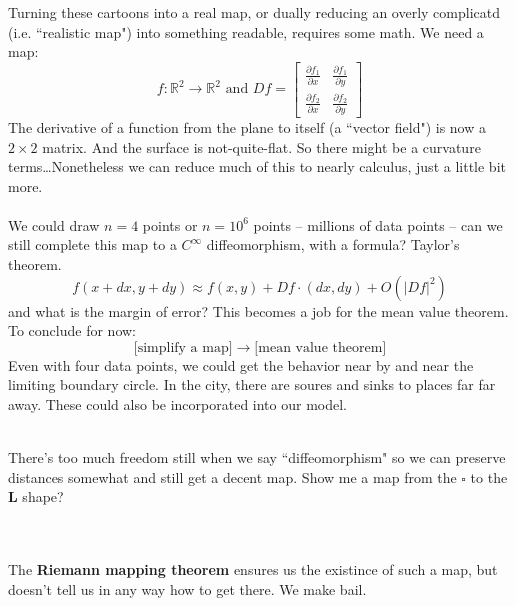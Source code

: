 \documentclass[12pt]{article}
\begin{document}
Turning these cartoons into a real map, or dually reducing an overly complicatd (i.e. ``realistic map") into something readable, requires some math.  We need a map:
$$ f: \mathbb{R}^2 \to \mathbb{R}^2 \text{ and } Df = \left[ \begin{array}{cc}
\frac{\partial f_1}{\partial x} & \frac{\partial f_1}{\partial y}  \\ 
\frac{\partial f_2}{\partial x} & \frac{\partial f_2}{\partial y}  \end{array} \right] $$
The derivative of a function from the plane to itself (a ``vector field") is now a $2 \times 2$ matrix.  And the surface is not-quite-flat.  So there might be a curvature terms\dots Nonetheless we can reduce much of this to nearly calculus, just a little bit more. \\ \\ 
We could draw $n = 4$ points or $n = 10^6$ points -- millions of data points -- can we still complete this map to a $C^\infty$ diffeomorphism, with a formula?  Taylor's theorem.
$$ f(x + dx, y+dy) \approx f(x,y) +  Df \cdot (dx,dy)  + O(|Df|^2)$$
and what is the margin of error?  This becomes a job for the mean value theorem.  To conclude for now:
$$ \big[\text{simplify a map}\big] \to \big[\text{mean value theorem}\big] $$
Even with four data points, we could get the behavior near by and near the limiting boundary circle.  In the city, there are soures and sinks to places far far away.  These could also be incorporated into our model.  \\ \\
\begin{minipage}{0.5\textwidth}
\end{minipage}
\begin{minipage}{0.5\textwidth}
There's too much freedom still when we say ``diffeomorphism" so we can preserve distances somewhat and still get a decent map.  Show me a map from the $\square$ to the $\textbf{L}$ shape?
\end{minipage} \\ \\
\noindent The \textbf{Riemann mapping theorem} ensures us the existince of such a map, but doesn't tell us in any way how to get there.  We make bail.
\vfill
\end{document}
